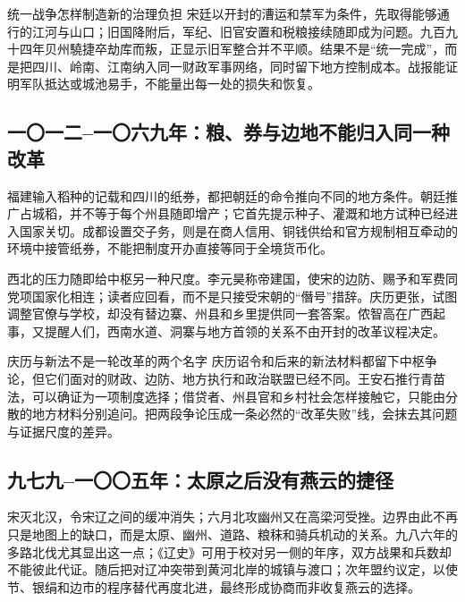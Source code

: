\begin{causalchain}{统一战争怎样制造新的治理负担}
宋廷以开封的漕运和禁军为条件，先取得能够通行的江河与山口；旧国降附后，军纪、旧官安置和税粮接续随即成为问题。九百九十四年贝州驍捷卒劫库而叛，正显示旧军整合并不平顺。结果不是“统一完成”，而是把四川、岭南、江南纳入同一财政军事网络，同时留下地方控制成本。战报能证明军队抵达或城池易手，不能量出每一处的损失和恢复。
\end{causalchain}

\subsection{一〇一二--一〇六九年：粮、券与边地不能归入同一种改革}
福建输入稻种的记载和四川的纸券，都把朝廷的命令推向不同的地方条件。朝廷推广占城稻，并不等于每个州县随即增产；它首先提示种子、灌溉和地方试种已经进入国家关切。成都设置交子务，则是在商人信用、铜钱供给和官方规制相互牵动的环境中接管纸券，不能把制度开办直接等同于全境货币化。

西北的压力随即给中枢另一种尺度。李元昊称帝建国，使宋的边防、赐予和军费同党项国家化相连；读者应回看，而不是只接受宋朝的“僭号”措辞。庆历更张，试图调整官僚与学校，却没有替边寨、州县和乡里提供同一套答案。侬智高在广西起事，又提醒人们，西南水道、洞寨与地方首领的关系不由开封的改革议程决定。

\begin{debate}{庆历与新法不是一轮改革的两个名字}
庆历诏令和后来的新法材料都留下中枢争论，但它们面对的财政、边防、地方执行和政治联盟已经不同。王安石推行青苗法，可以确证为一项制度选择；借贷者、州县官和乡村社会怎样接触它，只能由分散的地方材料分别追问。把两段争论压成一条必然的“改革失败”线，会抹去其问题与证据尺度的差异。
\end{debate}

\subsection{九七九--一〇〇五年：太原之后没有燕云的捷径}
宋灭北汉，令宋辽之间的缓冲消失；六月北攻幽州又在高梁河受挫。边界由此不再只是地图上的缺口，而是太原、幽州、道路、粮秣和骑兵机动的关系。九八六年的多路北伐尤其显出这一点；《辽史》可用于校对另一侧的年序，双方战果和兵数却不能彼此代证。随后把对辽冲突带到黄河北岸的城镇与渡口；次年盟约议定，以使节、银绢和边市的程序替代再度北进，最终形成协商而非收复燕云的选择。

